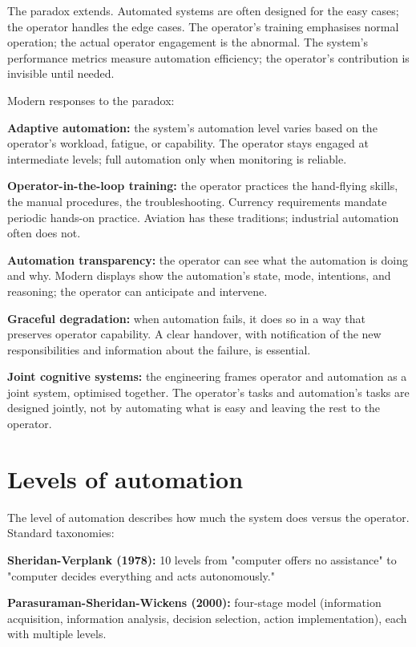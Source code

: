 The paradox extends. Automated systems are often designed for the easy cases; the operator handles the edge cases. The operator's training emphasises normal operation; the actual operator engagement is the abnormal. The system's performance metrics measure automation efficiency; the operator's contribution is invisible until needed.

Modern responses to the paradox:

\textbf{Adaptive automation:} the system's automation level varies based on the operator's workload, fatigue, or capability. The operator stays engaged at intermediate levels; full automation only when monitoring is reliable.

\textbf{Operator-in-the-loop training:} the operator practices the hand-flying skills, the manual procedures, the troubleshooting. Currency requirements mandate periodic hands-on practice. Aviation has these traditions; industrial automation often does not.

\textbf{Automation transparency:} the operator can see what the automation is doing and why. Modern displays show the automation's state, mode, intentions, and reasoning; the operator can anticipate and intervene.

\textbf{Graceful degradation:} when automation fails, it does so in a way that preserves operator capability. A clear handover, with notification of the new responsibilities and information about the failure, is essential.

\textbf{Joint cognitive systems:} the engineering frames operator and automation as a joint system, optimised together. The operator's tasks and automation's tasks are designed jointly, not by automating what is easy and leaving the rest to the operator.

\section{Levels of automation}

The level of automation describes how much the system does versus the operator. Standard taxonomies:

\textbf{Sheridan-Verplank (1978):} 10 levels from "computer offers no assistance" to "computer decides everything and acts autonomously."

\textbf{Parasuraman-Sheridan-Wickens (2000):} four-stage model (information acquisition, information analysis, decision selection, action implementation), each with multiple levels.

